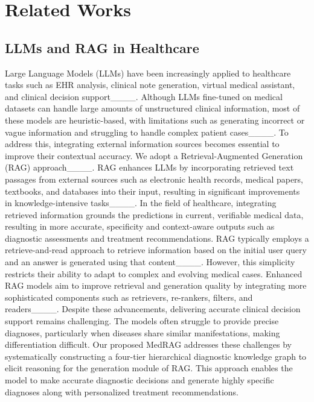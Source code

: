\section{Related Works}
\subsection{LLMs and RAG in Healthcare} 
Large Language Models (LLMs) have been increasingly applied to healthcare tasks such as EHR analysis, clinical note generation, virtual medical assistant, and clinical decision support____. Although LLMs fine-tuned on medical datasets can handle large amounts of unstructured clinical information, most of these models are heuristic-based, with limitations such as generating incorrect or vague information and struggling to handle complex patient cases____. To address this, integrating external information sources becomes essential to improve their contextual accuracy. We adopt a Retrieval-Augmented Generation (RAG) approach____. 
% 
RAG enhances LLMs by incorporating retrieved text passages from external sources such as electronic health records, medical papers, textbooks, and databases into their input, resulting in significant improvements in knowledge-intensive tasks____. In the field of healthcare, integrating retrieved information grounds the predictions in current, verifiable medical data, resulting in more accurate, specificity and context-aware outputs such as diagnostic assessments and treatment recommendations.
% 
RAG typically employs a retrieve-and-read approach to retrieve information based on the initial user query and an answer is generated using that content____. 
However, this simplicity restricts their ability to adapt to complex and evolving medical cases.
Enhanced RAG models aim to improve retrieval and generation quality by integrating more sophisticated components such as retrievers, re-rankers, filters, and readers____.
Despite these advancements, delivering accurate clinical decision support remains challenging. The models often struggle to provide precise diagnoses, particularly when diseases share similar manifestations, making differentiation difficult.
Our proposed MedRAG addresses these challenges by systematically constructing a four-tier hierarchical diagnostic knowledge graph to elicit reasoning for the generation module of RAG. This approach enables the model to make accurate diagnostic decisions and generate highly specific diagnoses along with personalized treatment recommendations.

